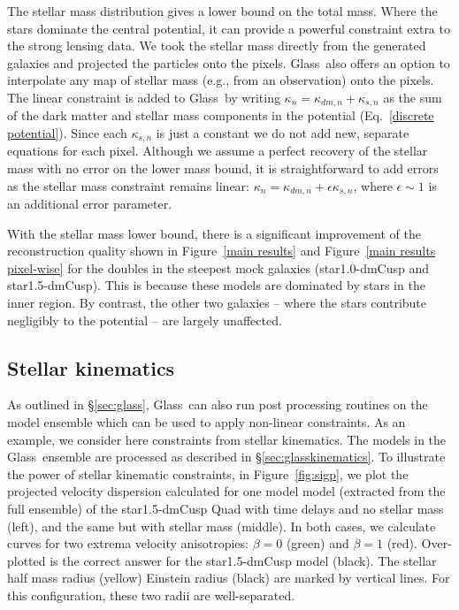 \documentclass[galley,usenatbib]{mn2e}
\newcommand{\Glass}{{\sc Glass}}
\newcommand{\figref}[1] {Figure~\ref{#1}}
\newcommand{\eqnrefp}[1] {(Eq.~\ref{#1})}
\newcommand{\secref}[1] {\S\ref{#1}}
\newcommand{\mockAC}{{\sc star1.0-dmCusp}}
\newcommand{\mockBC}{{\sc star1.5-dmCusp}}
\begin{document}
The stellar mass distribution gives a lower bound on the total mass. Where the
stars dominate the central potential, it can provide a powerful constraint
extra to the strong lensing data. We took the stellar mass directly from the
generated galaxies and projected the particles onto the pixels. \Glass\ also
offers an option to interpolate any map of stellar mass (e.g., from an
observation) onto the pixels. The linear constraint is added to \Glass\ by
writing $\kappa_n = \kappa_{dm,n} + \kappa_{s,n}$ as the sum of the dark matter
and stellar mass components in the potential \eqnrefp{discrete potential}.
Since each $\kappa_{s,n}$ is just a constant we do not add new, separate
equations for each pixel. Although we assume a perfect recovery of the stellar
mass with no error on the lower mass bound, it is straightforward to add errors
as the stellar mass constraint remains linear: $\kappa_n = \kappa_{dm,n} +
\epsilon \kappa_{s,n}$, where $\epsilon \sim 1$ is an additional error
parameter. 

With the stellar mass lower bound, there is a significant improvement of the
reconstruction quality shown in \figref{main results} and \figref{main results
pixel-wise} for the doubles in the steepest mock galaxies (\mockAC{} and
\mockBC). This is because these models are dominated by stars in the inner
region. By contrast, the other two galaxies -- where the stars contribute
negligibly to the potential -- are largely unaffected.

\subsection{Stellar kinematics}\label{sec:results_stellar_kinematics}

As outlined in \secref{sec:glass}, \Glass\ can also run post processing
routines on the model ensemble which can be used to apply non-linear
constraints. As an example, we consider here constraints from stellar
kinematics. The models in the \Glass\ ensemble are processed as described in
\S\ref{sec:glasskinematics}.  To illustrate the power of stellar kinematic
constraints, in \figref{fig:sigp}, we plot the projected velocity dispersion
calculated for one model model (extracted from the full ensemble) of the
\mockBC{} Quad with time delays and no stellar mass (left), and the same but
with stellar mass (middle).  In both cases, we calculate curves for two
extrema velocity anisotropies: $\beta=0$ (green) and $\beta=1$ (red).
Over-plotted is the correct answer for the \mockBC{} model (black). The stellar
half mass radius (yellow) Einstein radius (black) are marked by vertical lines.
For this configuration, these two radii are well-separated.
\end{document}
